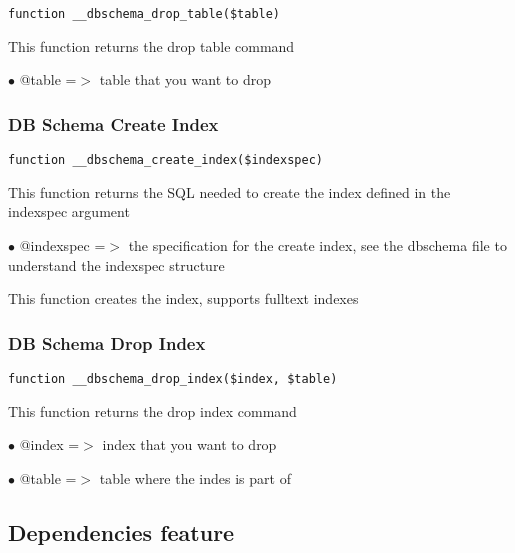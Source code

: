 \documentclass[a4paper]{article}
\begin{document}
\begin{lstlisting}
function __dbschema_drop_table($table)
\end{lstlisting}

This function returns the drop table command

\begin{compactitem}
\item[\color{myblue}$\bullet$] @table =$>$ table that you want to drop
\end{compactitem}

\hypertarget{toc433}{}
\subsubsection{DB Schema Create Index}

\begin{lstlisting}
function __dbschema_create_index($indexspec)
\end{lstlisting}

This function returns the SQL needed to create the index defined in the
indexspec argument

\begin{compactitem}
\item[\color{myblue}$\bullet$] @indexspec =$>$ the specification for the create index, see the dbschema
              file to understand the indexspec structure
\end{compactitem}

This function creates the index, supports fulltext indexes

\hypertarget{toc434}{}
\subsubsection{DB Schema Drop Index}

\begin{lstlisting}
function __dbschema_drop_index($index, $table)
\end{lstlisting}

This function returns the drop index command

\begin{compactitem}
\item[\color{myblue}$\bullet$] @index =$>$ index that you want to drop
\item[\color{myblue}$\bullet$] @table =$>$ table where the indes is part of
\end{compactitem}

\hypertarget{toc435}{}
\subsection{Dependencies feature}
\end{document}
